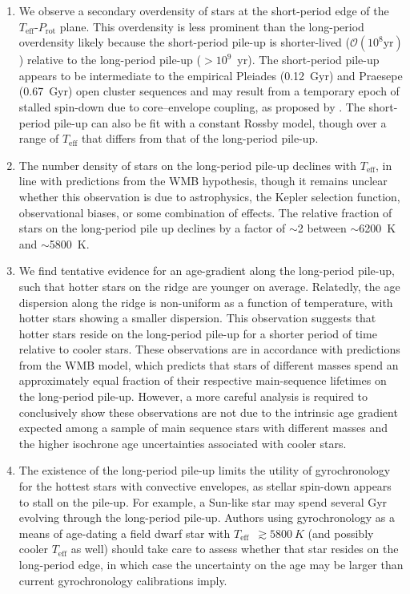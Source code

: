 \documentclass[linenumbers,tighten,trackchanges,twocolumn]{aastex631}
\newcommand{\teff}{\ensuremath{T_{\mathrm{eff}}}\xspace}
\newcommand{\prot}{\ensuremath{P_\mathrm{rot}}\xspace}
\begin{document}
\begin{enumerate}
    \item We observe a secondary overdensity of stars at the short-period edge of the \teff-\prot plane. This overdensity is less prominent than the long-period overdensity likely because the short-period pile-up is shorter-lived ($\mathcal{O}(10^8 \text{yr})$) relative to the long-period pile-up ($>10^9$~yr). The short-period pile-up appears to be intermediate to the empirical Pleiades (0.12~Gyr) and Praesepe (0.67~Gyr) open cluster sequences and may result from a temporary epoch of stalled spin-down due to core–envelope coupling, as proposed by \citet{Curtis2020}. The short-period pile-up can also be fit with a constant Rossby model, though over a range of \teff that differs from that of the long-period pile-up.
    
    \item The number density of stars on the long-period pile-up declines with \teff, in line with predictions from the WMB hypothesis, though it remains unclear whether this observation is due to astrophysics, the Kepler selection function, observational biases, or some combination of effects. The relative fraction of stars on the long-period pile up declines by a factor of $\sim$2 between $\sim$6200~K and $\sim$5800~K. 
    
    \item We find tentative evidence for an age-gradient along the long-period pile-up, such that hotter stars on the ridge are younger on average. Relatedly, the age dispersion along the ridge is non-uniform as a function of temperature, with hotter stars showing a smaller dispersion. This observation suggests that hotter stars reside on the long-period pile-up for a shorter period of time relative to cooler stars. These observations are in accordance with predictions from the WMB model, which predicts that stars of different masses spend an approximately equal fraction of their respective main-sequence lifetimes on the long-period pile-up. However, a more careful analysis is required to conclusively show these observations are not due to the intrinsic age gradient expected among a sample of main sequence stars with different masses and the higher isochrone age uncertainties associated with cooler stars.
    
    \item The existence of the long-period pile-up limits the utility of gyrochronology for the hottest stars with convective envelopes, as stellar spin-down appears to stall on the pile-up. For example, a Sun-like star may spend several Gyr evolving through the long-period pile-up. Authors using gyrochronology as a means of age-dating a field dwarf star with \teff~$\gtrsim 5800~K$ (and possibly cooler \teff as well) should take care to assess whether that star resides on the long-period edge, in which case the uncertainty on the age may be larger than current gyrochronology calibrations imply.
    

\end{enumerate}
\end{document}
